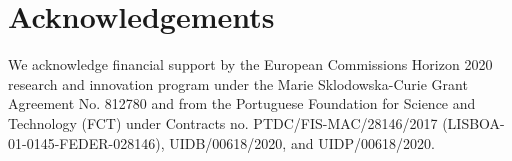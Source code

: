 \documentclass[aps,pre,twocolumn,showpacs,superscriptaddress,amsmath,amssymb,longbibliography]{revtex4-2}
\begin{document}
\section*{Acknowledgements}
We acknowledge financial support by the European Commissions Horizon 2020 research and innovation program under the Marie Sklodowska-Curie Grant Agreement No. 812780 and from the Portuguese Foundation for Science
and Technology (FCT) under Contracts no. PTDC/FIS-MAC/28146/2017 (LISBOA-
01-0145-FEDER-028146), UIDB/00618/2020, and UIDP/00618/2020.


\end{document}
